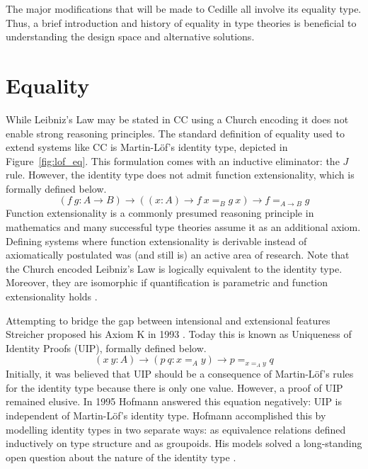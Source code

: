 The major modifications that will be made to Cedille all involve its equality type.
Thus, a brief introduction and history of equality in type theories is beneficial to understanding the design space and alternative solutions.

\section{Equality}

While Leibniz's Law may be stated in CC using a Church encoding it does not enable strong reasoning principles.
The standard definition of equality used to extend systems like CC is Martin-L\"{o}f's identity type, depicted in Figure~\ref{fig:lof_eq}.
This formulation comes with an inductive eliminator: the $J$ rule.
However, the identity type does not admit function extensionality, which is formally defined below.
$$(f\ g : A \to B) \to ((x : A) \to f\ x =_B g\ x) \to f =_{A \to B} g$$
Function extensionality is a commonly presumed reasoning principle in mathematics and many successful type theories assume it as an additional axiom.
Defining systems where function extensionality is derivable instead of axiomatically postulated was (and still is) an active area of research.
Note that the Church encoded Leibniz's Law is logically equivalent to the identity type.
Moreover, they are isomorphic if quantification is parametric and function extensionality holds \cite{abel2020_equality}.

Attempting to bridge the gap between intensional and extensional features Streicher proposed his Axiom K in 1993 \cite{streicher1993}.
Today this is known as Uniqueness of Identity Proofs (UIP), formally defined below.
$$(x\ y : A) \to (p\ q : x =_A y) \to p =_{x =_A y} q$$
Initially, it was believed that UIP should be a consequence of Martin-L\"{o}f's rules for the identity type because there is only one value.
However, a proof of UIP remained elusive.
In 1995 Hofmann answered this equation negatively: UIP is independent of Martin-L\"{o}f's identity type.
Hofmann accomplished this by modelling identity types in two separate ways: as equivalence relations defined inductively on type structure and as groupoids.
His models solved a long-standing open question about the nature of the identity type \cite{hofmann1995, hofmann1996}.



